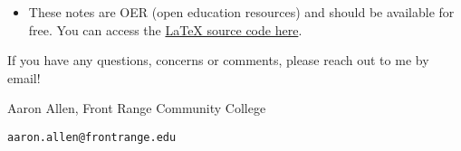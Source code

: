\begin{itemize}
\item These notes are OER (open education resources) and should be available for free. You can access the \href{https://www.overleaf.com/read/qyqfjbgpysqx}{LaTeX source code here}.

\end{itemize}

If you have any questions, concerns or comments, please reach out to me by email!

Aaron Allen, Front Range Community College
\begin{verbatim}
aaron.allen@frontrange.edu
\end{verbatim}